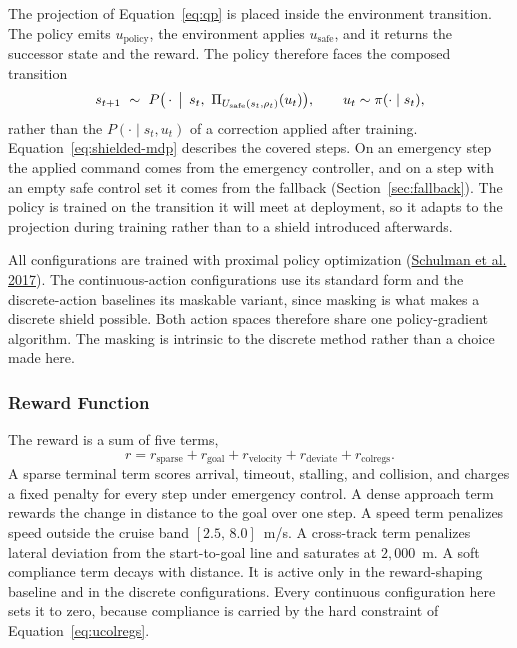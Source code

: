 \documentclass[10pt,letterpaper]{article}
\newcommand{\citl}[2]{(\hyperlink{ref:#1}{#2})}
\begin{document}
The projection of Equation~\eqref{eq:qp} is placed inside the environment transition. The policy emits
$u_{\mathrm{policy}}$, the environment applies $u_{\mathrm{safe}}$, and it returns the
successor state and the reward. The policy therefore faces the composed transition
\begin{equation}
 s_{t+1}\ \sim\ P\bigl(\,\cdot\,\bigm|\, s_t,\ \Pi_{U_{\mathrm{safe}}(s_t,\rho_t)}(u_t)\bigr),
 \qquad u_t\sim\pi(\cdot\mid s_t),
 \label{eq:shielded-mdp}
\end{equation}
rather than the $P(\cdot\mid s_t,u_t)$ of a correction applied after training.
Equation~\eqref{eq:shielded-mdp} describes the covered steps. On an emergency step the
applied command comes from the emergency controller, and on a step with an empty safe
control set it comes from the fallback (Section~\ref{sec:fallback}). The policy is
trained on the transition it will meet at deployment, so it adapts to the projection
during training rather than to a shield introduced afterwards.

 All configurations are trained with proximal policy
optimization \citl{schulman2017}{Schulman et al. 2017}. The continuous-action configurations use its standard form and the discrete-action
baselines its maskable variant, since masking is what makes a discrete shield possible.
Both action spaces therefore share one policy-gradient algorithm. The masking is
intrinsic to the discrete method rather than a choice made here.

\subsubsection{Reward Function}

The reward is a sum of five terms,
\begin{equation}
 r=r_{\mathrm{sparse}}+r_{\mathrm{goal}}+r_{\mathrm{velocity}}+r_{\mathrm{deviate}}+r_{\mathrm{colregs}}.
 \label{eq:reward}
\end{equation}
A sparse terminal term scores arrival, timeout, stalling, and collision, and charges a
fixed penalty for every step under emergency control. A dense approach term rewards the
change in distance to the goal over one step. A speed term penalizes speed outside the
cruise band $[2.5,\,8.0]$~m/s. A cross-track term penalizes lateral deviation from the
start-to-goal line and saturates at $2{,}000$~m. A soft compliance term decays with
distance. It is active only in the reward-shaping baseline and in the discrete
configurations. Every continuous configuration here sets it to zero, because compliance is
carried by the hard constraint of Equation~\eqref{eq:ucolregs}.
\end{document}
